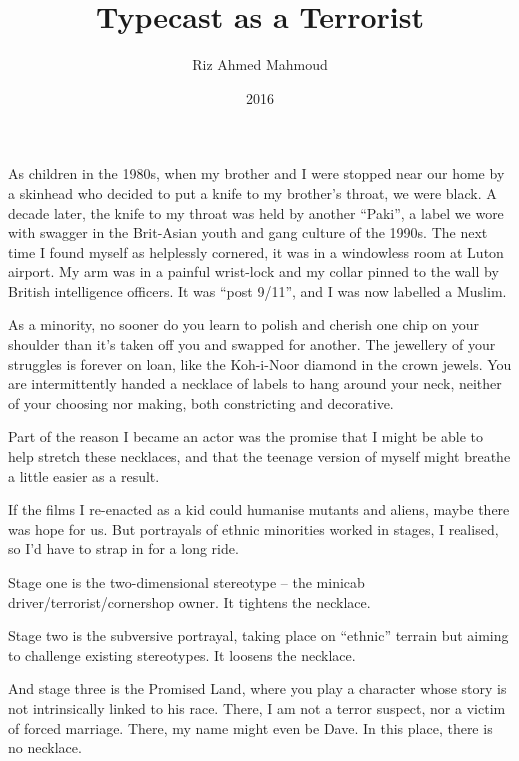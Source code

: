 \documentclass[10pt,a4paper]{article}
\begin{document}
\title{Typecast as a Terrorist}
\date{2016}
\author{Riz Ahmed Mahmoud}
\maketitle
    
\thispagestyle{plain}
\setcounter{page}{1}
\linenumbers As children in the 1980s, when my brother and I were stopped near our home by a skinhead who decided to put a knife to my brother’s throat, we were black. A decade later, the knife to my throat was held by another “Paki”, a label we wore with swagger in the Brit-Asian youth and gang culture of the 1990s. The next time I found myself as helplessly cornered, it was in a windowless room at Luton airport. My arm was in a painful wrist-lock and my collar pinned to the wall by British intelligence officers. It was “post 9/11”, and I was now labelled a Muslim.

As a minority, no sooner do you learn to polish and cherish one chip on your shoulder than it’s taken off you and swapped for another. The jewellery of your struggles is forever on loan, like the Koh-i-Noor diamond in the crown jewels. You are intermittently handed a necklace of labels to hang around your neck, neither of your choosing nor making, both constricting and decorative.

Part of the reason I became an actor was the promise that I might be able to help stretch these necklaces, and that the teenage version of myself might breathe a little easier as a result.

If the films I re-enacted as a kid could humanise mutants and aliens, maybe there was hope for us. But portrayals of ethnic minorities worked in stages, I realised, so I’d have to strap in for a long ride.

Stage one is the two-dimensional stereotype – the minicab driver/terrorist/cornershop owner. It tightens the necklace.

Stage two is the subversive portrayal, taking place on “ethnic” terrain but aiming to challenge existing stereotypes. It loosens the necklace.

And stage three is the Promised Land, where you play a character whose story is not intrinsically linked to his race. There, I am not a terror suspect, nor a victim of forced marriage. There, my name might even be Dave. In this place, there is no necklace.
\end{document}

